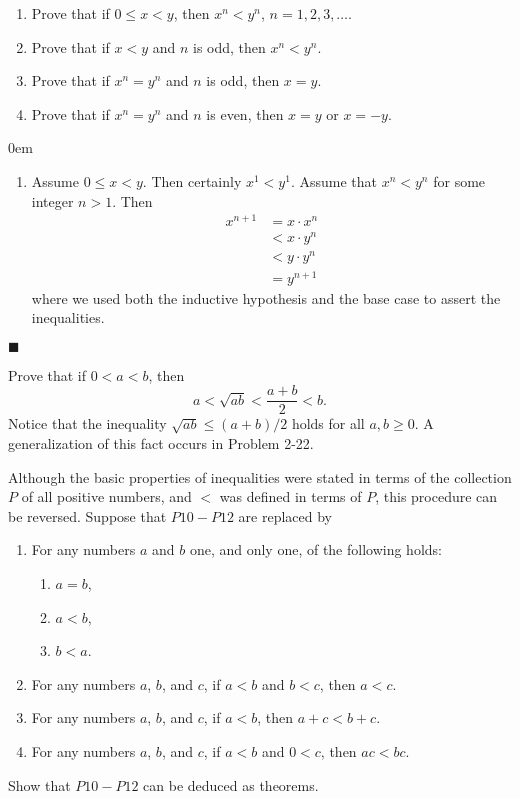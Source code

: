 \documentclass[12pt]{article}
\renewcommand{\qed}{\hfill$\blacksquare$}
\renewenvironment{proof}{\begin{addmargin}[1em]{0em}\begin{newproof}}{\end{newproof}\end{addmargin}\qed}
\newenvironment{problem}[2][Problem]{\begin{trivlist}
\item[\hskip \labelsep {\bfseries #1}\hskip \labelsep {\bfseries #2.}]}{\end{trivlist}}
\begin{document}
\begin{problem}{1.6}
\begin{enumerate}[label=(\roman*)]
	\item Prove that if $0\leq x < y$, then $x^n < y^n$, $n=1,2,3,\ldots$.
	\item Prove that if $x<y$ and $n$ is odd, then $x^n<y^n$.
	\item Prove that if $x^n = y^n$ and $n$ is odd, then $x=y$.
	\item Prove that if $x^n = y^n$ and $n$ is even, then $x=y$ or $x=-y$.
\end{enumerate}
\end{problem}
\begin{proof}
\begin{enumerate}[label=(\roman*)]
	\item Assume $0\leq x < y$. Then certainly $x^1 < y^1 $. Assume that $x^n < y^n$ for some integer $n>1$. Then \[ \begin{split} x^{n+1} & = x\cdot x^n \\ & < x \cdot y^n \\ & < y \cdot y^n \\ & = y^{n+1} \end{split} \] where we used both the inductive hypothesis and the base case to assert the inequalities.
\end{enumerate}
\end{proof}



\begin{problem}{1.7}
Prove that if $0<a<b$, then $$ a < \sqrt{ab} < \frac{a+b}{2} < b.$$ Notice that the inequality $\sqrt{ab} \leq \left(a+b\right)/2$ holds for all $a,b\geq 0$. A generalization of this fact occurs in Problem 2-22.
\end{problem}

\begin{problem}{1.8}
Although the basic properties of inequalities were stated in terms of the collection $P$ of all positive numbers, and $<$ was defined in terms of $P$, this procedure can be reversed. Suppose that $P10-P12$ are replaced by
\begin{enumerate}[label=($P'$\arabic*),start=10]
	\item For any numbers $a$ and $b$ one, and only one, of the following holds:
	\begin{enumerate}[label=(\roman*)]
		\item $a=b$,
		\item $a<b$,
		\item $b<a$.
	\end{enumerate}
	\item For any numbers $a$, $b$, and $c$, if $a<b$ and $b<c$, then $a<c$.
	\item For any numbers $a$, $b$, and $c$, if $a<b$, then $a+c < b+c$.
	\item For any numbers $a$, $b$, and $c$, if $a<b$ and $0<c$, then $ac<bc$.
\end{enumerate}
Show that $P10-P12$ can be deduced as theorems.
\end{problem}







\end{document}

